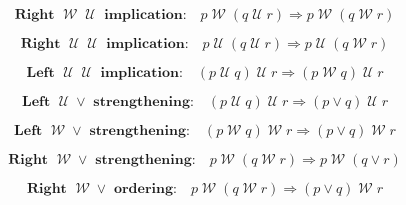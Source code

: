 \documentclass[12pt, fleqn, leqno]{article}
\newcommand{\impl}{\ensuremath{\Rightarrow}}        %
\newcommand{\Until}{\;\mathcal{U}\;}
\newcommand{\Wait}{\;\mathcal{W}\;}
\newcommand{\spacer}{\vspace{-30pt}}
\begin{document}
\spacer

\begin{equation}\label{E:RightWaitUntilImpl}
\textbf{Right $\Wait\Until$ implication:}\quad p\Wait (q\Until r)\impl p\Wait (q\Wait r)
\end{equation}

\spacer

\begin{equation}\label{E:RightUntilUntilImpl}
\textbf{Right $\Until\Until$ implication:}\quad p\Until (q\Until r)\impl p\Until (q\Wait r)
\end{equation}

\spacer

\begin{equation}\label{E:LeftUntilUntilImpl}
\textbf{Left $\Until\Until$ implication:}\quad (p\Until q)\Until r\impl (p\Wait q)\Until r
\end{equation}

\spacer

\begin{equation}\label{E:untilImpAbsR}
\textbf{Left $\Until\lor$ strengthening:}\quad (p \Until q) \Until r \impl (p \lor q) \Until r
\end{equation}

\spacer

\begin{equation}\label{E:waitImpAbsR}
\textbf{Left $\Wait\lor$ strengthening:}\quad (p \Wait q) \Wait r \impl (p \lor q) \Wait r
\end{equation}

\spacer

\begin{equation}\label{E:waitQwaitRImpWaitQorR}
\textbf{Right $\Wait\lor$ strengthening:}\quad p \Wait (q \Wait r) \impl p \Wait (q \lor r)
\end{equation}

%

\spacer

\begin{equation}\label{E:leftAssocWait}
\textbf{Right $\Wait\lor$ ordering:}\quad p \Wait (q \Wait r) \impl (p \lor q) \Wait r
\end{equation}
\end{document}
